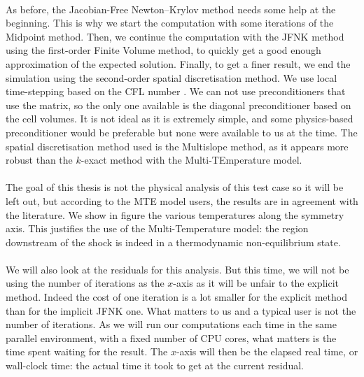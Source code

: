         \paragraph{}
        As before, the Jacobian-Free Newton--Krylov method needs some help at the beginning.
        This is why we start the computation with some iterations of the Midpoint method.
        Then, we continue the computation with the JFNK method using the first-order Finite Volume method, to quickly get a good enough approximation of the expected solution.
        Finally, to get a finer result, we end the simulation using the second-order spatial discretisation method.
        We use local time-stepping based on the CFL number .
        We can not use preconditioners that use the matrix, so the only one available is the diagonal preconditioner based on the cell volumes.
        It is not ideal as it is extremely simple, and some physics-based preconditioner would be preferable \cite{KnollKeyes2004} but none were available to us at the time.
        The spatial discretisation method used is the Multislope method, as it appears more robust than the $k$-exact method with the Multi-TEmperature model.

        \paragraph{}
        The goal of this thesis is not the physical analysis of this test case so it will be left out, but according to the MTE model users, the results are in agreement with the literature. 
        We show in figure  the various temperatures along the symmetry axis.
        This justifies the use of the Multi-Temperature model: the region downstream of the shock is indeed in a thermodynamic non-equilibrium state.

        \paragraph{}
        We will also look at the residuals for this analysis.
        But this time, we will not be using the number of iterations as the $x$-axis as it will be unfair to the explicit method.
        Indeed the cost of one iteration is a lot smaller for the explicit method than for the implicit JFNK one.
        What matters to us and a typical user is not the number of iterations.
        As we will run our computations each time in the same parallel environment, with a fixed number of CPU cores, what matters is the time spent waiting for the result.
        The $x$-axis will then be the elapsed real time, or wall-clock time: the actual time it took to get at the current residual.

